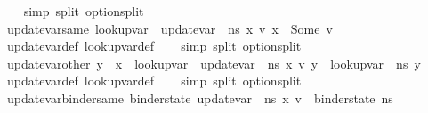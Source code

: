 \begin{isabellebody}
\ \ \isamarkupfalse%
\ {\isacharparenleft}{\kern0pt}simp\ split{\isacharcolon}{\kern0pt}\ option{\isachardot}{\kern0pt}split{\isacharparenright}{\kern0pt}%
\endisatagproof
{\isafoldproof}%
%
\isadelimproof
\isanewline
%
\endisadelimproof
\isanewline
{}\isamarkupfalse%
\ update{\isacharunderscore}{\kern0pt}var{\isacharunderscore}{\kern0pt}same{\isacharcolon}{\kern0pt}\ {\isachardoublequoteopen}lookup{\isacharunderscore}{\kern0pt}var\ {\isasymLambda}\ {\isacharparenleft}{\kern0pt}update{\isacharunderscore}{\kern0pt}var\ {\isasymLambda}\ n{\isacharunderscore}{\kern0pt}s\ x\ v{\isacharparenright}{\kern0pt}\ x\ {\isacharequal}{\kern0pt}\ Some\ v{\isachardoublequoteclose}\isanewline
%
\isadelimproof
\ \ %
\endisadelimproof
%
\isatagproof
{}\isamarkupfalse%
\ update{\isacharunderscore}{\kern0pt}var{\isacharunderscore}{\kern0pt}def\ lookup{\isacharunderscore}{\kern0pt}var{\isacharunderscore}{\kern0pt}def\isanewline
\ \ \isamarkupfalse%
\ {\isacharparenleft}{\kern0pt}simp\ split{\isacharcolon}{\kern0pt}\ option{\isachardot}{\kern0pt}split{\isacharparenright}{\kern0pt}%
\endisatagproof
{\isafoldproof}%
%
\isadelimproof
\isanewline
%
\endisadelimproof
\isanewline
{}\isamarkupfalse%
\ update{\isacharunderscore}{\kern0pt}var{\isacharunderscore}{\kern0pt}other{\isacharcolon}{\kern0pt}\ {\isachardoublequoteopen}y\ {\isasymnoteq}\ x\ {\isasymLongrightarrow}\ lookup{\isacharunderscore}{\kern0pt}var\ {\isasymLambda}\ {\isacharparenleft}{\kern0pt}update{\isacharunderscore}{\kern0pt}var\ {\isasymLambda}\ n{\isacharunderscore}{\kern0pt}s\ x\ v{\isacharparenright}{\kern0pt}\ y\ {\isacharequal}{\kern0pt}\ lookup{\isacharunderscore}{\kern0pt}var\ {\isasymLambda}\ n{\isacharunderscore}{\kern0pt}s\ y{\isachardoublequoteclose}\isanewline
%
\isadelimproof
\ \ %
\endisadelimproof
%
\isatagproof
{}\isamarkupfalse%
\ update{\isacharunderscore}{\kern0pt}var{\isacharunderscore}{\kern0pt}def\ lookup{\isacharunderscore}{\kern0pt}var{\isacharunderscore}{\kern0pt}def\isanewline
\ \ \isamarkupfalse%
\ {\isacharparenleft}{\kern0pt}simp\ split{\isacharcolon}{\kern0pt}\ option{\isachardot}{\kern0pt}split{\isacharparenright}{\kern0pt}%
\endisatagproof
{\isafoldproof}%
%
\isadelimproof
\isanewline
%
\endisadelimproof
\isanewline
{}\isamarkupfalse%
\ update{\isacharunderscore}{\kern0pt}var{\isacharunderscore}{\kern0pt}binder{\isacharunderscore}{\kern0pt}same{\isacharcolon}{\kern0pt}\ {\isachardoublequoteopen}binder{\isacharunderscore}{\kern0pt}state\ {\isacharparenleft}{\kern0pt}update{\isacharunderscore}{\kern0pt}var\ {\isasymLambda}\ n{\isacharunderscore}{\kern0pt}s\ x\ v{\isacharparenright}{\kern0pt}\ {\isacharequal}{\kern0pt}\ binder{\isacharunderscore}{\kern0pt}state\ n{\isacharunderscore}{\kern0pt}s{\isachardoublequoteclose}\isanewline

\end{isabellebody}
